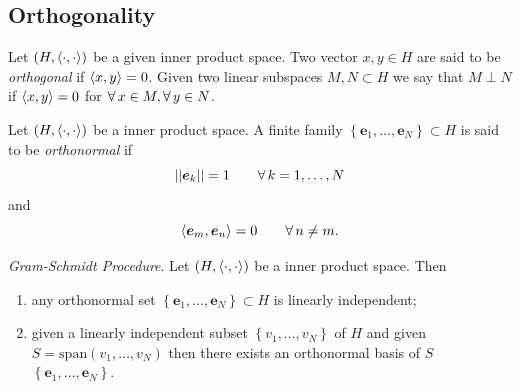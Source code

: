 \documentclass{article}
\begin{document}
\subsection{Orthogonality}
\begin{definition}
	Let $\left(H,\langle \cdot,\cdot \rangle\right)$ be a given inner product space. Two vector $x,y\in H$ are said to be \emph{orthogonal} if $\langle x,y \rangle=0$. Given two linear subspaces $M,N\subset H$ we say that $M\perp N$ if $\langle x,y \rangle=0$ for $\forall\, x\in M,\forall\, y\in N$.
\end{definition}
\begin{definition}
	Let $\left(H,\langle \cdot,\cdot \rangle\right)$ be a inner product space. A finite family $\left\{\bm{e}_{1},\ldots,\bm{e}_{N}\right\}\subset H$ is said to be \emph{orthonormal} if
	\begin{equation*}
		\left|\left|\bm{e}_{k}\right|\right|=1\qquad\forall\, k=1,\ldots,N
	\end{equation*}
	and
	\begin{equation*}
		\langle \bm{e}_{m},\bm{e}_{n} \rangle=0\qquad\forall\, n\neq m.
	\end{equation*}
\end{definition}
\begin{proposition}
	\emph{Gram-Schmidt Procedure}. Let $\left(H,\langle \cdot,\cdot \rangle\right)$ be a inner product space. Then
	\begin{enumerate}
		\item any orthonormal set $\left\{\bm{e}_{1},\ldots,\bm{e}_{N}\right\}\subset H$ is linearly independent;
		\item given a linearly independent subset $\left\{v_{1},\ldots,v_{N}\right\}$ of $H$ and given $S=\mathrm{span}(v_{1},\ldots,v_{N})$ then there exists an orthonormal basis of $S$ $\left\{\bm{e}_{1},\ldots,\bm{e}_{N}\right\}$.
	\end{enumerate}
\end{proposition}
\end{document}
